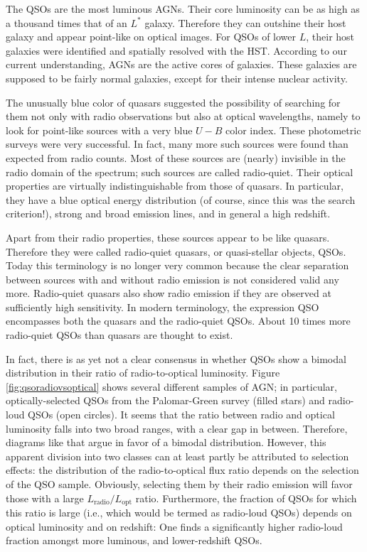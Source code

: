 \documentclass[a4paper,11pt]{article}
\begin{document}
{\noindent}The QSOs are the most luminous AGNs. Their core luminosity can be as high as a thousand times that of an $L^*$  galaxy. Therefore they can outshine their host galaxy and appear point-like on optical images. For QSOs of lower $L$, their host galaxies were identified and spatially resolved with the HST. According to our current understanding, AGNs are the active cores of galaxies. These galaxies are supposed to be fairly normal galaxies, except for their intense nuclear activity.

{\noindent}The unusually blue color of quasars suggested the possibility of searching for them not only with radio observations but also at optical wavelengths, namely to look for point-like sources with a very blue $U-B$ color index. These photometric surveys were very successful. In fact, many more such sources were found than expected from radio counts. Most of these sources are (nearly) invisible in the radio domain of the spectrum; such sources are called radio-quiet. Their optical properties are virtually indistinguishable from those of quasars. In particular, they have a blue optical energy distribution (of course, since this was the search criterion!), strong and broad emission lines, and in general a high redshift.

{\noindent}Apart from their radio properties, these sources appear to be like quasars. Therefore they were called radio-quiet quasars, or quasi-stellar objects, QSOs. Today this terminology is no longer very common because the clear separation between sources with and without radio emission is not considered valid any more. Radio-quiet quasars also show radio emission if they are observed at sufficiently high sensitivity. In modern terminology, the expression QSO encompasses both the quasars and the radio-quiet QSOs. About 10 times more radio-quiet QSOs than quasars are thought to exist.

{\noindent}In fact, there is as yet not a clear consensus in whether QSOs show a bimodal distribution in their ratio of radio-to-optical luminosity. Figure \ref{fig:qsoradiovsoptical} shows several different samples of AGN; in particular, optically-selected QSOs from the Palomar-Green survey (filled stars) and radio-loud QSOs (open circles). It seems that the ratio between radio and optical luminosity falls into two broad ranges, with a clear gap in between. Therefore, diagrams like that argue in favor of a bimodal distribution. However, this apparent division into two classes can at least partly be attributed to selection effects: the distribution of the radio-to-optical flux ratio depends on the selection of the QSO sample. Obviously, selecting them by their radio emission will favor those with a large $L_\mathrm{radio}/L_\mathrm{opt}$ ratio. Furthermore, the fraction of QSOs for which this ratio is large (i.e., which would be termed as radio-loud QSOs) depends on optical luminosity and on redshift: One finds a significantly higher radio-loud fraction amongst more luminous, and lower-redshift QSOs.
\end{document}
